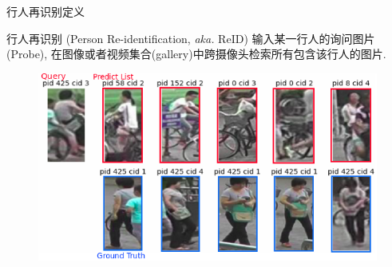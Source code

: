 \documentclass[notes]{beamer}
\begin{document}
\begin{frame}
	{行人再识别定义}
	\begin{block}{行人再识别 (Person Re-identification, \textit{aka.} ReID)}
		输入某一行人的询问图片(Probe), 在图像或者视频集合(gallery)中跨摄像头检索所有包含该行人的图片.
	\end{block}
	\begin{figure}
		\includegraphics[width=0.9\linewidth]{2018-03-11-22-56-05.png}
	\end{figure}
\end{frame}
\end{document}
